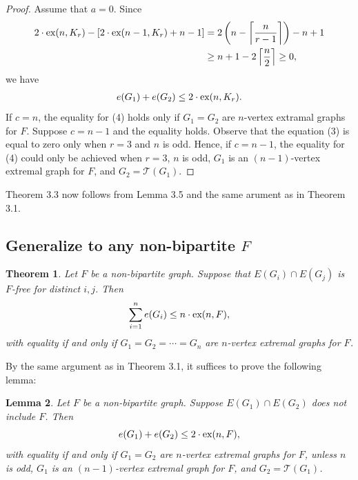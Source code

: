 \documentclass[a4paper]{article}
\newtheorem{theorem}{Theorem}[section]
\newtheorem{lemma}[theorem]{Lemma}
\begin{document}
\begin{proof}
  Assume that $a = 0$. Since
  \begin{align}
    2 \cdot \textnormal{ex}(n, K_r) - [2 \cdot \textnormal{ex}(n - 1, K_r) + n - 1]
    &= 2\left(n - \left\lceil \frac{n}{r - 1} \right\rceil\right) - n + 1 \\
    &\geq n + 1 - 2\left\lceil \frac{n}{2} \right\rceil \geq 0, \nonumber
  \end{align}
  we have
  \begin{gather}
    e(G_1) + e(G_2) \leq 2 \cdot \textnormal{ex}(n, K_r).
  \end{gather}
  If $c = n$, the equality for (4) holds only if $G_1 = G_2$ are $n$-vertex extramal graphs for $F$.
  Suppose $c = n - 1$ and the equality holds. Observe that the equation (3) is equal to zero only
  when $r = 3$ and $n$ is odd. Hence, if $c = n - 1$, the equality for (4) could only be achieved
  when $r = 3$, $n$ is odd, $G_1$ is an $(n - 1)$-vertex extremal graph for $F$, and $G_2 =
  \mathcal{T}(G_1)$.
\end{proof}

Theorem 3.3 now follows from Lemma 3.5 and the same arument as in Theorem 3.1.

\subsection{Generalize to any non-bipartite $F$}

\begin{theorem}
  Let $F$ be a non-bipartite graph. Suppose that $E(G_i) \cap E(G_j)$ is $F$-free for distinct $i,
  j$. Then
  \[
    \sum_{i = 1}^n e(G_i) \leq n \cdot \textnormal{ex}(n, F),
  \]
  with equality if and only if $G_1 = G_2 = \cdots = G_n$ are $n$-vertex extremal graphs for $F$.
\end{theorem}

By the same argument as in Theorem 3.1, it suffices to prove the following lemma:

\begin{lemma}
  Let $F$ be a non-bipartite graph. Suppose $E(G_1) \cap E(G_2)$ does not include $F$. Then
  \[
    e(G_1) + e(G_2) \leq 2 \cdot \textnormal{ex}(n, F),
  \]
  with equality if and only if $G_1 = G_2$ are $n$-vertex extremal graphs for $F$, unless $n$ is
  odd, $G_1$ is an $(n - 1)$-vertex extremal graph for $F$, and $G_2 = \mathcal{T}(G_1)$. 
\end{lemma}
\end{document}
